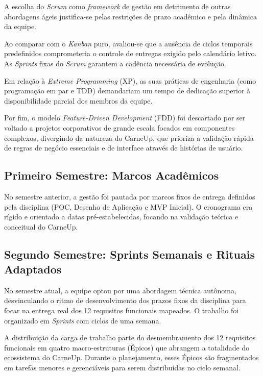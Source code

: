 \documentclass[
	12pt,				%
	openany,			%
	oneside,			%
	a4paper,			%
	english,			%
	french,				%
	spanish,			%
	brazil				%
	]{abntex2}
\begin{document}
A escolha do \textit{Scrum} como \textit{framework} de gestão em detrimento de outras abordagens ágeis justifica-se pelas restrições de prazo acadêmico e pela dinâmica da equipe. 

Ao comparar com o \textit{Kanban} puro, avaliou-se que a ausência de ciclos temporais predefinidos comprometeria o controle de entregas exigido pelo calendário letivo. As \textit{Sprints} fixas do \textit{Scrum} garantem a cadência necessária de evolução. 

Em relação à \textit{Extreme Programming} (XP), as suas práticas de engenharia (como programação em par e TDD) demandariam um tempo de dedicação superior à disponibilidade parcial dos membros da equipe. 

Por fim, o modelo \textit{Feature-Driven Development} (FDD) foi descartado por ser voltado a projetos corporativos de grande escala focados em componentes complexos, divergindo da natureza do CarneUp, que prioriza a validação rápida de regras de negócio essenciais e de interface através de histórias de usuário.

\subsection{Primeiro Semestre: Marcos Acadêmicos}

No semestre anterior, a gestão foi pautada por marcos fixos de entrega definidos pela disciplina (POC, Desenho de Aplicação e MVP Inicial). O cronograma era rígido e orientado a datas pré-estabelecidas, focando na validação teórica e conceitual do CarneUp.

\subsection{Segundo Semestre: Sprints Semanais e Rituais Adaptados}

No semestre atual, a equipe optou por uma abordagem técnica autônoma, desvinculando o ritmo de desenvolvimento dos prazos fixos da disciplina para focar na entrega real dos 12 requisitos funcionais mapeados. O trabalho foi organizado em \textit{Sprints} com ciclos de uma semana. 

A distribuição da carga de trabalho parte do desmembramento dos 12 requisitos funcionais em quatro macro-estruturas (Épicos) que abrangem a totalidade do ecossistema do CarneUp. Durante o planejamento, esses Épicos são fragmentados em tarefas menores e gerenciáveis para serem distribuídas no ciclo semanal. 
\end{document}
